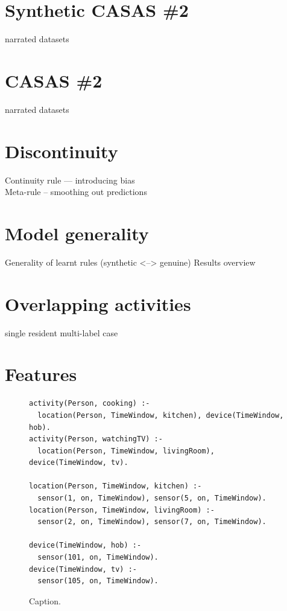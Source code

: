 \documentclass[12pt, a4paper, pdflatex, leqno, twoside, openright]{report}
\begin{document}
  \section{Synthetic CASAS \#2}
narrated datasets
  \section{CASAS \#2}
narrated datasets
  \section{Discontinuity}
Continuity rule --- introducing bias\\
Meta-rule -- smoothing out predictions
  \section{Model generality}
Generality of learnt rules (synthetic <--> genuine) Results overview
  \section{Overlapping activities}
single resident multi-label case

  \section{Features}


\begin{figure}[htb] %
  \begin{verbatim}
activity(Person, cooking) :-
  location(Person, TimeWindow, kitchen), device(TimeWindow, hob).
activity(Person, watchingTV) :-
  location(Person, TimeWindow, livingRoom), device(TimeWindow, tv).

location(Person, TimeWindow, kitchen) :-
  sensor(1, on, TimeWindow), sensor(5, on, TimeWindow).
location(Person, TimeWindow, livingRoom) :-
  sensor(2, on, TimeWindow), sensor(7, on, TimeWindow).

device(TimeWindow, hob) :-
  sensor(101, on, TimeWindow).
device(TimeWindow, tv) :-
  sensor(105, on, TimeWindow).
  \end{verbatim}
  \caption{Caption.\label{lst:label}}
\end{figure}
\end{document}
